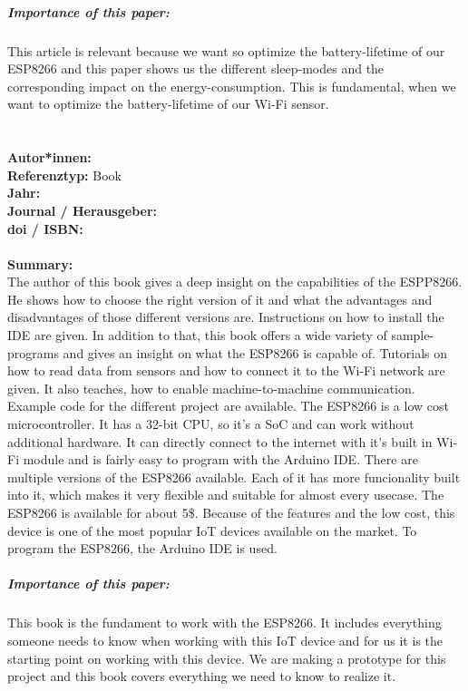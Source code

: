 \documentclass{report}
\newcommand{\createBookHeader}[1]{
    {\let\clearpage\relax \chapter{\citetitle{#1}}}
    \noindent
    \textbf{Autor*innen:} \citeauthor{#1} \\
    \textbf{Referenztyp:} Book\\
    \textbf{Jahr:} \citeyear{#1} \\
    \textbf{Journal / Herausgeber:} \citelist{#1}{publisher}\\
    \textbf{doi / ISBN:} \citefield{#1}{isbn} \\\\
    \textbf{Summary:}\\
}
\begin{document}
\paragraph{Importance of this paper:}
This article is relevant because we want so optimize the battery-lifetime of our ESP8266 and this paper shows us the different sleep-modes and the corresponding impact on the energy-consumption. This is fundamental, when we want to optimize the battery-lifetime of our Wi-Fi sensor.


\createBookHeader{schwartz_internet_2016}
The author of this book gives a deep insight on the capabilities of the ESPP8266. He shows how to choose the right version of it and what the advantages and disadvantages of those different versions are. Instructions on how to install the IDE are given. In addition to that, this book offers a wide variety of sample-programs and gives an insight on what the ESP8266 is capable of. Tutorials on how to read data from sensors and how to connect it to the Wi-Fi network are given. It also teaches, how to enable machine-to-machine communication. Example code for the different project are available. The ESP8266 is a low cost microcontroller. It has a 32-bit CPU, so it's a SoC and can work without additional hardware. It can directly connect to the internet with it's built in Wi-Fi module and is fairly easy to program with the Arduino IDE. There are multiple versions of the ESP8266 available. Each of it has more funcionality built into it, which makes it very flexible and suitable for almost every usecase. The ESP8266 is available for about 5\$. Because of the features and the low cost, this device is one of the most popular IoT devices available on the market. To program the ESP8266, the Arduino IDE is used.\\
\paragraph{Importance of this paper:} This book is the fundament to work with the ESP8266. It includes everything someone needs to know when working with this IoT device and for us it is the starting point on working with this device. We are making a prototype for this project and this book covers everything we need to know to realize it.
\end{document}
